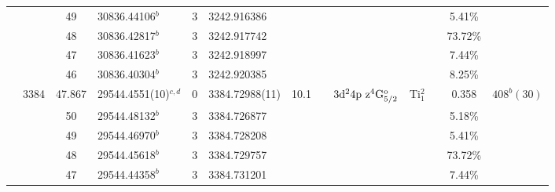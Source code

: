 \begin{table*}
\begin{center}
{\begin{tabular}{:l;l;c;l;c;l;c;l;l;c;c;c;c}
\rowstyle{\itshape}               &        & 49        & 30836.44106$^{b}$                & 3 &   3242.916386      &      & $                                        $ & $                                        $ &             &              & 5.41\%    & $     ^{}     $\\
\rowstyle{\itshape}               &        & 48        & 30836.42817$^{b}$                & 3 &   3242.917742      &      & $                                        $ & $                                        $ &             &              & 73.72\%   & $     ^{}     $\\
\rowstyle{\itshape}               &        & 47        & 30836.41623$^{b}$                & 3 &   3242.918997      &      & $                                        $ & $                                        $ &             &              & 7.44\%    & $     ^{}     $\\
\rowstyle{\itshape}               &        & 46        & 30836.40304$^{b}$                & 3 &   3242.920385      &      & $                                        $ & $                                        $ &             &              & 8.25\%    & $     ^{}     $\\
                                  & 3384   & 47.867    & 29544.4551(10)$^{c,d}$           & 0 &    3384.72988(11)  & 10.1 & $                                        $ & $3\rm{d}^24\rm{p~z}^4\rm{G}_{5/2}^{\rm o}$ & Ti$^2_{1}$  &              & 0.358     & $  408^{b}(30) $\\
\rowstyle{\itshape}               &        & 50        & 29544.48132$^{b}$                & 3 &   3384.726877      &      & $                                        $ & $                                        $ &             &              & 5.18\%    & $     ^{}     $\\
\rowstyle{\itshape}               &        & 49        & 29544.46970$^{b}$                & 3 &   3384.728208      &      & $                                        $ & $                                        $ &             &              & 5.41\%    & $     ^{}     $\\
\rowstyle{\itshape}               &        & 48        & 29544.45618$^{b}$                & 3 &   3384.729757      &      & $                                        $ & $                                        $ &             &              & 73.72\%   & $     ^{}     $\\
\rowstyle{\itshape}               &        & 47        & 29544.44358$^{b}$                & 3 &   3384.731201      &      & $                                        $ & $                                        $ &             &              & 7.44\%    & $     ^{}     $\\

\end{tabular}}
\end{center}
\end{table*}
